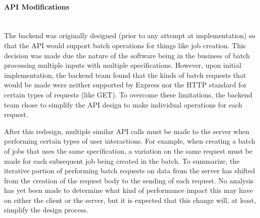 \paragraph{API Modifications} \mbox{}\\[\paragraphheaderspace]
The backend was originally designed (prior to any attempt at implementation) so that the API would support batch operations for things like job creation. This decision was made due the nature of the software being in the business of batch processing multiple inputs with multiple specifications. However, upon initial implementation, the backend team found that the kinds of batch requests that would be made were neither supported by Express nor the HTTP standard for certain types of requests (like GET). To overcome these limitations, the backend team chose to simplify the API design to make individual operations for each request.\par
After this redesign, multiple similar API calls must be made to the server when performing certain types of user interactions. For example, when creating a batch of jobs that uses the same specification, a variation on the same request must be made for each subsequent job being created in the batch. To summarize, the iterative portion of performing batch requests on data from the server has shifted from the creation of the request body to the sending of each request. No analysis has yet been made to determine what kind of performance impact this may have on either the client or the server, but it is expected that this change will, at least, simplify the design process.\par
